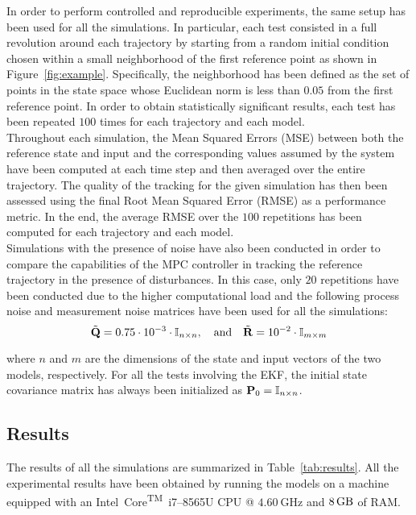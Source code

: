 \documentclass[../main.tex]{subfiles}
\begin{document}
In order to perform controlled and reproducible experiments, the same setup has
been used for all the simulations. In particular, each test consisted in a full
revolution around each trajectory by starting from a random initial condition
chosen within a small neighborhood of the first reference point as shown in
Figure~\ref{fig:example}. Specifically,
the neighborhood has been defined as the set of points in the state space whose
Euclidean norm is less than $0.05$ from the first reference point. In order to
obtain statistically significant results, each test has been repeated $100$
times for each trajectory and each model.\\
Throughout each simulation, the Mean Squared Errors (MSE) between both the
reference state and input 
and the corresponding values assumed by the system have been computed at each time step and then averaged over
the entire trajectory. The quality of the tracking for the given simulation has
then been assessed using the final Root Mean Squared Error (RMSE) as a
performance metric. In the end, the average RMSE over the $100$ repetitions has
been computed for each trajectory and each model.\\
Simulations with the presence of noise have also been conducted in order to
compare the capabilities of the MPC controller in tracking the reference
trajectory in the presence of disturbances. In this case, only $20$ repetitions
have been conducted due to the higher computational load and the following process
noise and measurement noise matrices have been used for all the simulations:
\begin{equation*}
	\tilde{\mathbf{Q}} = 0.75 \cdot 10^{-3} \cdot \mathbb{I}_{n \times n},
	\quad \text{and} \quad
	\tilde{\mathbf{R}} = 10^{-2} \cdot \mathbb{I}_{m \times m}
\end{equation*}

where $n$ and $m$ are the dimensions of the state and input vectors of the two
models, respectively. For all the tests involving the EKF, the initial state
covariance matrix has always been initialized as $\mathbf{P}_0 = \mathbb{I}_{n \times
n}$.

\pagebreak
\subsection{Results}

The results of all the simulations are summarized in Table~\ref{tab:results}.
All the experimental results have been obtained by running the models on a machine equipped with an Intel\textsuperscript{\textregistered}~Core\textsuperscript{TM}~i7--8565U CPU @ $\SI{4.60}{\giga\hertz}$ and $\SI{8}{\giga\byte}$ of RAM.\\
\end{document}
